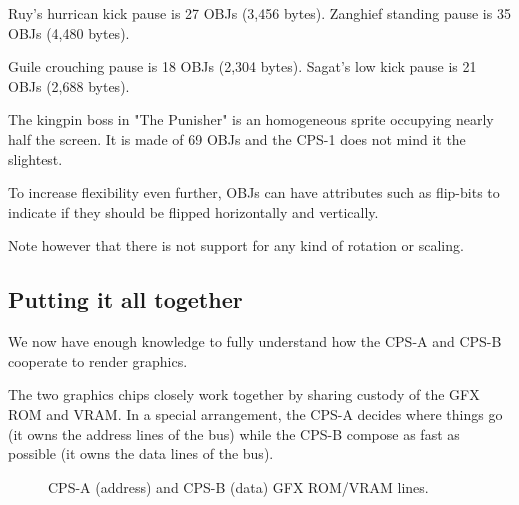 
Ruy's hurrican kick pause is 27 OBJs (3,456 bytes). Zanghief standing pause is 35 OBJs (4,480 bytes). 

\begin{minipage}[t]{0.4\linewidth}
\end{minipage}%
\hfill%
\begin{minipage}[t]{0.56\linewidth}
\end{minipage}

Guile crouching pause is 18 OBJs (2,304 bytes). Sagat's low kick pause is 21 OBJs (2,688 bytes). 




\begin{trivia}
 The kingpin boss in "The Punisher" is an homogeneous sprite occupying nearly half the screen. It is made of 69 OBJs and the CPS-1 does not mind it the slightest.
\end{trivia}

To increase flexibility even further, OBJs can have attributes such as flip-bits to indicate if they should be flipped horizontally and vertically. 

Note however that there is not support for any kind of rotation or scaling.





\subsection{Putting it all together}

We now have enough knowledge to fully understand how the CPS-A and CPS-B cooperate to render graphics.

The two graphics chips closely work together by sharing custody of the GFX ROM and VRAM. In a special arrangement, the CPS-A decides where things go (it owns the address lines of the bus) while the CPS-B compose as fast as possible (it owns the data lines of the bus). 

\begin{figure}[H]
\caption*{CPS-A (address) and CPS-B (data) GFX ROM/VRAM lines.}
\end{figure}

